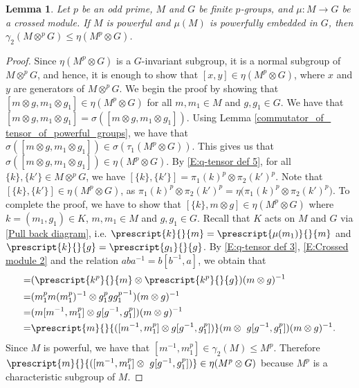 \documentclass[12pt]{elsarticle}
\newtheorem{lemma}[theorem]{Lemma}
\newtheorem*{main corollary*}{Main Corollary}
\theoremstyle{definition}
\newcommand{\ptens}{
	\otimes^p}
\begin{document}
\begin{lemma} \label{commutatorMqtensorG}
	Let $p$ be an odd prime, $M$ and $G$ be finite $p$-groups, and $\mu:M\to G$ be a crossed module. If $M$ is powerful and $\mu(M)$ is powerfully embedded in $G$, then $\gamma_2(M \ptens G) \leqslant \eta(M^p \otimes G)$.
\end{lemma}

\begin{proof}
Since $\eta(M^p \otimes G)$ is a $G$-invariant subgroup, it is a normal subgroup of $M \ptens G$, and hence, it is enough to show that $[x,y] \in \eta(M^p \otimes G)$, where $x$ and $y$ are generators of $M \ptens G$. We begin the proof by showing that $[m \otimes g,m_1 \otimes g_1] \in \eta(M^p \otimes G)$ for all $m,m_1 \in M$ and $g,g_1 \in G$. We have that ${[m \otimes g,m_1 \otimes g_1]=\sigma([m \otimes g,m_1 \otimes g_1])}$. Using Lemma \ref{commutator_of_ tensor_of_powerful_groups}, we have that $\sigma([m \otimes g,m_1 \otimes g_1]) \in \sigma(\tau_1(M^p \otimes G))$. This gives us that ${\sigma([m \otimes g,m_1 \otimes g_1]) \in \eta(M^p \otimes G)}$. By \eqref{E:q-tensor def 5}, for all $\{k\},\{k'\} \in M \ptens G$, we have ${[\{k\},\{k'\}] = \pi_1(k)^p \otimes \pi_2(k')^p}$. Note that $[\{k\},\{k'\}] \in \eta(M^p \otimes G)$, as $\pi_1(k)^p \otimes \pi_2(k')^p=\eta\big(\pi_1(k)^p \otimes \pi_2(k')^p\big)$.
To complete the proof, we have to show that $[\{k\},m \otimes g] \in \eta(M^p \otimes G)$ where $k=(m_1,g_1) \in K$, $m,m_1 \in M$ and $g,g_1 \in G$. Recall that $K$ acts on $M$ and $G$ via \eqref{Pull back diagram}, i.e. $\prescript{k}{}{m}=\prescript{\mu(m_1)}{}{m}$ and $\prescript{k}{}{g}= \prescript{g_1}{}{g}$. By \eqref{E:q-tensor def 3}, \eqref{E:Crossed module 2} and the relation $aba^{-1}=b[b^{-1},a]$, we obtain that 
	\begin{align*}
		[\{k\},m \otimes g] =& ( \prescript{k^p}{}{m} \otimes \prescript{k^p}{}{g})(m \otimes g)^{-1} \\
  =& ( m_1^pm(m_1^p)^{-1} \otimes g_1^{p}g{g_1^p}^{-1})(m \otimes g)^{-1} \\
		=&( m[m^{-1},m_1^p] \otimes g[g^{-1},g_1^p])(m \otimes g)^{-1} \\
		=& \prescript{m}{}{( [m^{-1},m_1^p] \otimes g[g^{-1},g_1^p])}( m \otimes \ g[g^{-1},g_1^p])(m \otimes g)^{-1}.
	\end{align*}
	Since $M$ is powerful, we have that $[m^{-1},m_1^p] \in \gamma_2(M) \leqslant M^p$. Therefore ${\prescript{m}{}{( [m^{-1},m_1^p] \otimes \ g[g^{-1},g_1^p])} \in \eta(M^p \otimes G)}$ because
    $M^p$ is a characteristic subgroup of $M$.

\end{proof}
\end{document}
